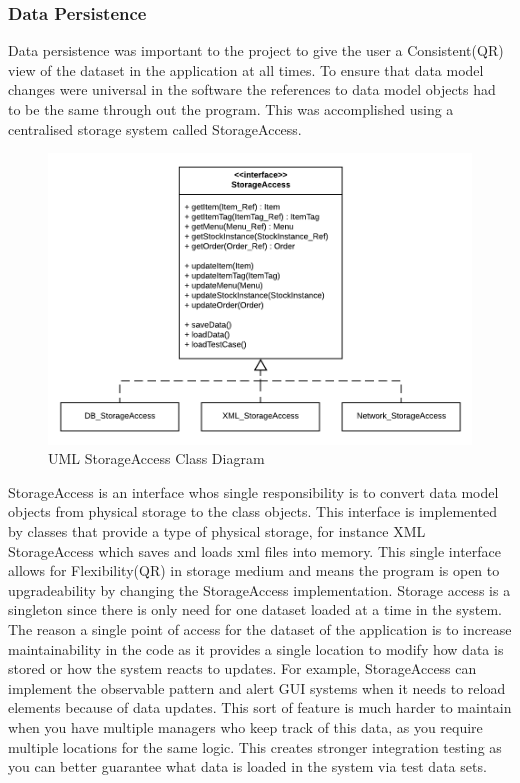 \pagebreak

\subsubsection{Data Persistence}
Data persistence was important to the project to give the user a Consistent(QR) view of the dataset in the application at all times. To ensure that data model changes were universal in the software the references to data model objects had to be the same through out the program. This was accomplished using a centralised storage system called StorageAccess. 

\begin{figure}[h]
	\centering
	\includegraphics[width=.75\linewidth]{images/data_model/storage.png}
	\caption{UML StorageAccess Class Diagram}
\end{figure}

StorageAccess is an interface whos single responsibility is to convert data model objects from physical storage to the class objects. This interface is implemented by classes that provide a type of physical storage, for instance XML StorageAccess which saves and loads xml files into memory. This single interface allows for Flexibility(QR) in storage medium and means the program is open to upgradeability by changing the StorageAccess implementation. Storage access is a singleton since there is only need for one dataset loaded at a time in the system. The reason a single point of access for the dataset of the application is to increase maintainability in the code as it provides a single location to modify how data is stored or how the system reacts to updates. For example, StorageAccess can implement the observable pattern and alert GUI systems when it needs to reload elements because of data updates. This sort of feature is much harder to maintain when you have multiple managers who keep track of this data, as you require multiple locations for the same logic. This creates stronger integration testing as you can better guarantee what data is loaded in the system via test data sets.

